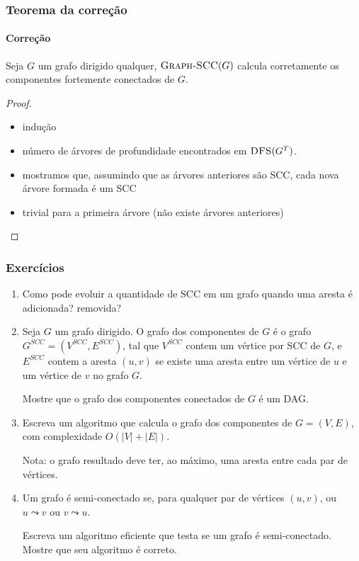 \documentclass{beamer}
\begin{document}

\begin{frame}
\frametitle{Teorema da correção}
\framesubtitle{Correção}

\begin{theorem}
Seja $G$ um grafo dirigido qualquer, $\textnormal{\scshape Graph-SCC}(G)$ calcula
corretamente os componentes fortemente conectados de $G$.
\end{theorem}

\pause

\begin{proof}
\begin{itemize}
\item indução 
\item número de árvores de profundidade encontrados em $\textnormal{\scshape DFS}(G^T)$.
\item mostramos que, assumindo que as árvores anteriores são SCC, 
  cada nova árvore formada é um SCC
\item trivial para a primeira árvore (não existe árvores anteriores)
\end{itemize}
\end{proof}
\end{frame}


\begin{frame}
\frametitle{Exercícios}

\begin{enumerate}
\item Como pode evoluir a quantidade de SCC em um grafo quando uma
  aresta é adicionada? removida?
\item Seja $G$ um grafo dirigido. O grafo dos componentes de $G$ é o grafo
  $G^{SCC} = (V^{SCC}, E^{SCC})$, tal que $V^{SCC}$ contem um vértice por
  SCC de $G$, e $E^{SCC}$ contem a aresta $(u, v)$ se existe uma aresta entre
  um vértice de $u$ e um vértice de $v$ no grafo $G$.

  Mostre que o grafo dos componentes conectados de $G$ é um DAG.
\item Escreva um algoritmo que calcula o grafo dos componentes de
  $G=(V, E)$, com complexidade $O(|V|+|E|)$. 

  Nota: o grafo resultado deve ter, ao máximo, uma aresta entre cada
  par de vértices.

\item Um grafo é semi-conectado se, para qualquer par de vértices $(u, v)$,
  ou $u \leadsto v$ ou $v \leadsto u$.

  Escreva um algoritmo eficiente que testa se um grafo é semi-conectado.
  Mostre que seu algoritmo é correto.
\end{enumerate}

\end{frame}
\end{document}
